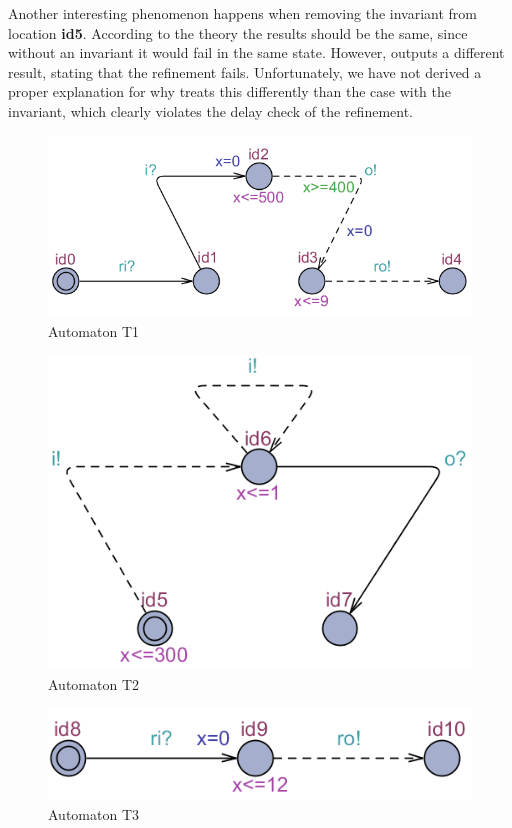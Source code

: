 Another interesting phenomenon happens when removing the invariant from location \textbf{id5}. According to the theory the results should be the same, since without an invariant it would fail in the same state. However,  outputs a different result, stating that the refinement fails. Unfortunately, we have not derived a proper explanation for why  treats this differently than the case with the invariant, which clearly violates the delay check of the refinement.
\begin{figure}
    \centering
    \includegraphics[scale = 0.7]{figures/T1.png}
    \caption{Automaton T1}
    \label{fig:T1}
\end{figure}
\begin{figure}
    \centering
    \includegraphics[scale = 0.7]{figures/T2.png}
    \caption{Automaton T2}
    \label{fig:T2}
\end{figure}
\begin{figure}
    \centering
    \includegraphics[scale = 0.7]{figures/T3.png}
    \caption{Automaton T3}
    \label{fig:T3}
\end{figure}
